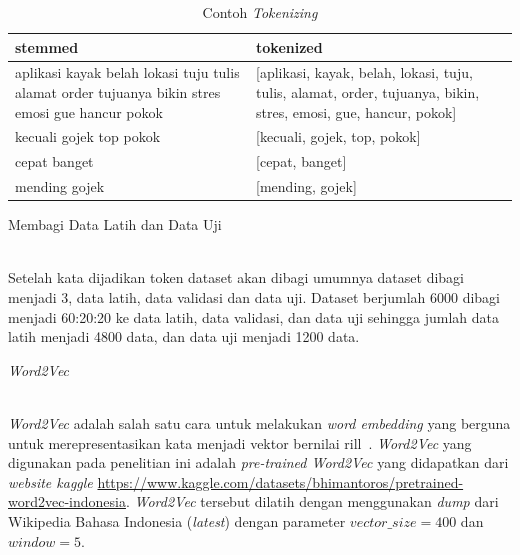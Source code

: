\begin{enumerate}
\begin{enumerate}
    \begin{table}[H]
      \centering
      \caption{Contoh \emph{Tokenizing}}
      \label{tab:contoh_tokenizing}
      \begin{tabularx}{\columnwidth}{|X|X|}
        \hline
        stemmed                                                                                         & tokenized                                                                                                       \\ \hline
        aplikasi kayak belah lokasi tuju tulis alamat order tujuanya bikin stres emosi gue hancur pokok & [aplikasi, kayak, belah, lokasi, tuju, tulis, alamat, order, tujuanya, bikin, stres, emosi, gue, hancur, pokok] \\ \hline
        kecuali gojek top pokok                                                                         & [kecuali, gojek, top, pokok]                                                                                    \\ \hline
        cepat banget                                                                                    & [cepat, banget]                                                                                                 \\ \hline
        mending gojek                                                                                   & [mending, gojek]                                                                                                \\ \hline
      \end{tabularx}
    \end{table}
  \end{enumerate}

  {\bfseries \item Membagi Data Latih dan Data Uji}\\
  Setelah kata dijadikan token dataset akan dibagi umumnya dataset dibagi menjadi 3, data latih,
  data validasi dan data uji. Dataset berjumlah 6000 dibagi menjadi 60:20:20 ke data latih, data validasi,
  dan data uji sehingga jumlah data latih menjadi 4800 data, dan data uji menjadi 1200 data.

  {\bfseries \item \emph{Word2Vec}}\\
  \emph{Word2Vec} adalah salah satu cara untuk melakukan \emph{word embedding} yang berguna untuk
  merepresentasikan kata menjadi vektor bernilai rill~\citep{Khattak2019}. \emph{Word2Vec} yang
  digunakan pada penelitian ini adalah \emph{pre-trained Word2Vec} yang didapatkan dari \emph{website kaggle}
  \url{https://www.kaggle.com/datasets/bhimantoros/pretrained-word2vec-indonesia}.
  \emph{Word2Vec} tersebut dilatih dengan menggunakan \emph{dump} dari Wikipedia Bahasa Indonesia (\emph{latest})
  dengan parameter $vector\_size=400$ dan $window=5$.


\end{enumerate}
